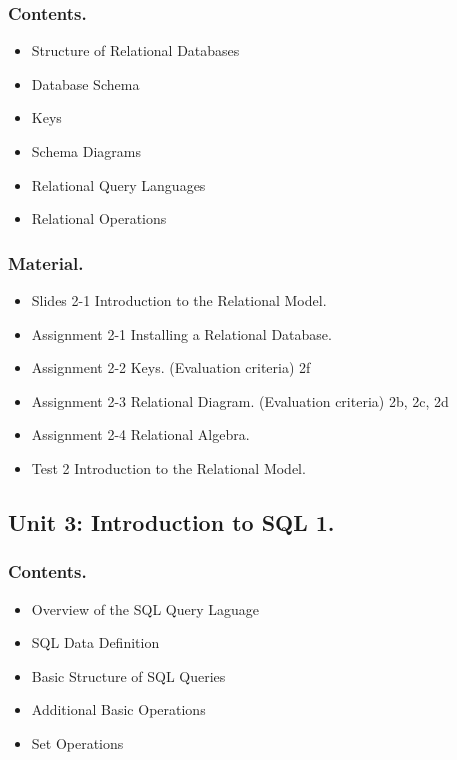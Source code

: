 \documentclass[catalan, a4paper, 12pt, titlepage]{article}
\begin{document}
  \subsubsection{Contents.}

  \begin{itemize}
	  \item Structure of Relational Databases
	  \item Database Schema
	  \item Keys
	  \item Schema Diagrams
	  \item Relational Query Languages
	  \item Relational Operations
  \end{itemize}

  \subsubsection{Material.}

  \begin{itemize}
          \item Slides 2-1 Introduction to the Relational Model.
	  \item Assignment 2-1 Installing a Relational Database.
	  \item Assignment 2-2 Keys. (\faGraduationCap Evaluation criteria) 2f
	  \item Assignment 2-3 Relational Diagram. (\faGraduationCap Evaluation criteria) 2b, 2c, 2d
	  \item Assignment 2-4 Relational Algebra.
	  \item Test 2 Introduction to the Relational Model.
  \end{itemize}

  \subsection{Unit 3: Introduction to SQL 1.}

  \subsubsection{Contents.}
  \begin{itemize}
	  \item Overview of the SQL Query Laguage
	  \item SQL Data Definition
	  \item Basic Structure of SQL Queries
	  \item Additional Basic Operations
	  \item Set Operations
  \end{itemize}
\end{document}
